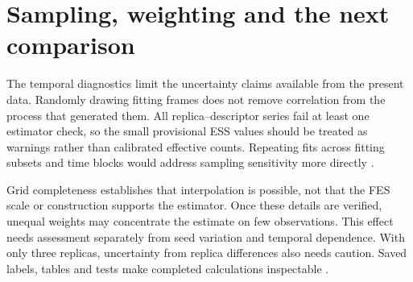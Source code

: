 \section{Sampling, weighting and the next comparison}
The temporal diagnostics limit the uncertainty claims available from the present data. Randomly drawing fitting frames does not remove correlation from the process that generated them. All replica--descriptor series fail at least one estimator check, so the small provisional ESS values should be treated as warnings rather than calibrated effective counts. Repeating fits across fitting subsets and time blocks would address sampling sensitivity more directly \autocite{grossfield2019}.

Grid completeness establishes that interpolation is possible, not that the FES scale or construction supports the estimator. Once these details are verified, unequal weights may concentrate the estimate on few observations. This effect needs assessment separately from seed variation and temporal dependence. With only three replicas, uncertainty from replica differences also needs caution. Saved labels, tables and tests make completed calculations inspectable \autocite{plumed2019,barker2022}.
